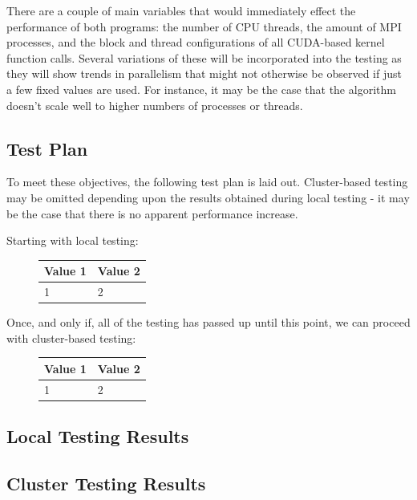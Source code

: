 \documentclass[conference]{IEEEtran}
\begin{document}
There are a couple of main variables that would immediately effect the performance of both programs: the number of CPU threads, the amount of MPI processes, and the block and thread configurations of all CUDA-based kernel function calls. Several variations of these will be incorporated into the testing as they will show trends in parallelism that might not otherwise be observed if just a few fixed values are used. For instance, it may be the case that the algorithm doesn't scale well to higher numbers of processes or threads.

\subsection{Test Plan}
\label{subsec:testplan}

To meet these objectives, the following test plan is laid out. Cluster-based testing may be omitted depending upon the results obtained during local testing - it may be the case that there is no apparent performance increase.

Starting with local testing:
\begin{figure}[!h]
    \centering
    \begin{tabular}{|l|l|}
        \hline
        Value 1 & Value 2 \\
        \hline
        1 & 2 \\
        \hline
    \end{tabular}
    \label{table:localtestplan}
\end{figure}

Once, and only if, all of the testing has passed up until this point, we can proceed with cluster-based testing:

\begin{figure}[!h]
    \centering
    \begin{tabular}{|l|l|}
        \hline
        Value 1 & Value 2 \\
        \hline
        1 & 2 \\
        \hline
    \end{tabular}
    \label{table:clustertestplan}
\end{figure}


\subsection{Local Testing Results}
\label{subsec:testing_local}

\subsection{Cluster Testing Results}
\label{subsec:testing_cluster}
\end{document}
